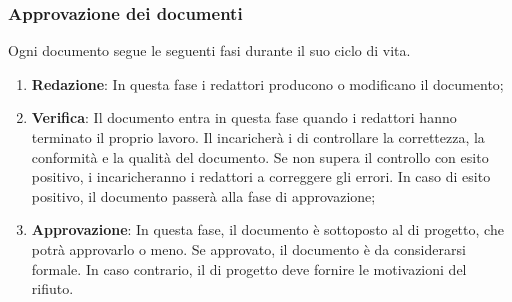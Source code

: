         \subsubsection{Approvazione dei documenti}
        Ogni documento segue le seguenti fasi durante il suo ciclo di vita.
            \begin{enumerate}
                \item \textbf{Redazione}: In questa fase i redattori producono o modificano il documento;
                \item \textbf{Verifica}: Il documento entra in questa fase quando i redattori hanno terminato il proprio lavoro. Il \roleProjectManager{} incaricherà i \roleVerifierP{} di controllare la correttezza, la conformità e la qualità del documento.
                                        Se non supera il controllo con esito positivo, i \roleVerifierP{} incaricheranno i redattori a correggere gli errori.
                                        In caso di esito positivo, il documento passerà alla fase di approvazione;
                \item\textbf{Approvazione}: In questa fase, il documento è sottoposto al \roleProjectManager{} di progetto, che potrà approvarlo o meno.
                                            Se approvato, il documento è da considerarsi formale.
                                            In caso contrario, il \roleProjectManager{} di progetto deve fornire le motivazioni del rifiuto.
            \end{enumerate}
    
